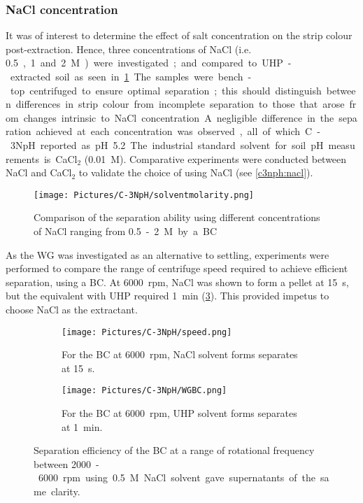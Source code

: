 \subsubsection{NaCl concentration}

It was of interest to determine the effect of salt concentration on the strip colour post-extraction. Hence, three concentrations of NaCl (i.e. \SI{0.5}, \SI{1} and \SI{2}{M}) were investigated; and compared to \gls{UHP}-extracted soil as seen in \cref{fig:solventmolarity}. The samples were bench-top centrifuged to ensure optimal separation; this should distinguish between differences in strip colour from incomplete separation to those that arose from changes intrinsic to NaCl concentration. A negligible difference in the separation achieved at each concentration was observed, all of which C-3NpH reported as pH {5.2}. The industrial standard solvent for soil pH measurements is CaCl$_2$ (\SI{0.01}{M}). Comparative experiments were conducted between NaCl and CaCl$_2$ to validate the choice of using NaCl (see \cref{c3nph:nacl}). 

\begin{figure}[h!]
	\centering
	\texttt{[image: Pictures/C-3NpH/solventmolarity.png]}
	\captionsetup{justification = centering}
    	\caption{Comparison of the separation ability using different concentrations of NaCl ranging from \SI{0.5}-\SI{2}{M} by a \gls{BC}}
	\label{fig:solventmolarity}
\end{figure}

As the WG was investigated as an alternative to settling, experiments were performed to compare the range of centrifuge speed required to achieve efficient separation, using a \gls{BC}. At \SI{6000}{rpm}, NaCl was shown to form a pellet at \SI{15}{s}, but the equivalent with \gls{UHP} required \SI{1}{min} (\cref{subfig:WGBC}). This provided impetus to choose NaCl as the extractant.



\begin{figure}[h!]
	\centering
	\begin{subfigure}[b]{0.45\linewidth} 
		\centering
		\texttt{[image: Pictures/C-3NpH/speed.png]}
		\captionsetup{justification = centering}
		\caption{For the \gls{BC} at \SI{6000}{rpm}, NaCl solvent forms separates at \SI{15}{s}.}
		\label{subfig:speed}
	\end{subfigure}
	\begin{subfigure}[b]{0.50\linewidth}
	\centering
		\texttt{[image: Pictures/C-3NpH/WGBC.png]}
		\captionsetup{justification = centering}
		\caption{For the \gls{BC} at \SI{6000}{rpm}, \gls{UHP} solvent forms separates at \SI{1}{min}.}
		\label{subfig:WGBC}
	\end{subfigure}
	\captionsetup{justification = centering}
	\caption{Separation efficiency of the \gls{BC} at a range of rotational frequency between \SI{2000}-\SI{6000}{rpm} using \SI{0.5}{M} NaCl solvent gave supernatants of the same clarity.}
	\label{fig:WGBC}
\end{figure}   	
 
